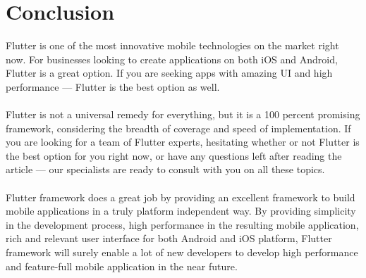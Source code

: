 \chapter{Conclusion}

\hspace{1cm}Flutter is one of the most innovative mobile technologies on the market right now. For businesses looking to create applications on both iOS and Android, Flutter is a great option. If you are seeking apps with amazing UI and high performance — Flutter is the best option as well.\\\\

Flutter is not a universal remedy for everything, but it is a 100 percent promising framework, considering the breadth of coverage and speed of implementation. If you are looking for a team of Flutter experts, hesitating whether or not Flutter is the best option for you right now, or have any questions left after reading the article — our specialists are ready to consult with you on all these topics.\\\\

Flutter framework does a great job by providing an excellent framework to build mobile applications in a truly platform independent way. By providing simplicity in the development process, high performance in the resulting mobile application, rich and relevant user interface for both Android and iOS platform, Flutter framework will surely enable a lot of new developers to develop high performance and feature-full mobile application in the near future.

